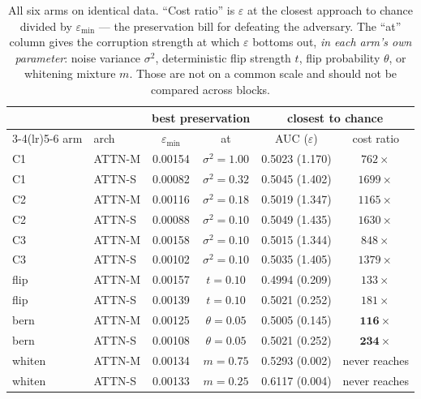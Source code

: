 \documentclass[11pt,a4paper]{article}
\newcommand{\vs}{\sigma^2}
\begin{document}
\begin{table}[h]\centering\small
\begin{tabular}{llcccc}
\toprule
& & \multicolumn{2}{c}{best preservation} & \multicolumn{2}{c}{closest to chance}\\
\cmidrule(lr){3-4}\cmidrule(lr){5-6}
arm & arch & $\varepsilon_{\min}$ & at & AUC ($\varepsilon$) & cost ratio\\
\midrule
C1     & ATTN-M & 0.00154 & $\vs\!=\!1.00$  & 0.5023 (1.170) & $762\times$\\
C1     & ATTN-S & 0.00082 & $\vs\!=\!0.32$  & 0.5045 (1.402) & $1699\times$\\
C2     & ATTN-M & 0.00116 & $\vs\!=\!0.18$  & 0.5019 (1.347) & $1165\times$\\
C2     & ATTN-S & 0.00088 & $\vs\!=\!0.10$  & 0.5049 (1.435) & $1630\times$\\
C3     & ATTN-M & 0.00158 & $\vs\!=\!0.10$  & 0.5015 (1.344) & $848\times$\\
C3     & ATTN-S & 0.00102 & $\vs\!=\!0.10$  & 0.5035 (1.405) & $1379\times$\\
\addlinespace
flip   & ATTN-M & 0.00157 & $t\!=\!0.10$    & 0.4994 (0.209) & $133\times$\\
flip   & ATTN-S & 0.00139 & $t\!=\!0.10$    & 0.5021 (0.252) & $181\times$\\
bern   & ATTN-M & 0.00125 & $\theta\!=\!0.05$ & 0.5005 (0.145) & $\mathbf{116\times}$\\
bern   & ATTN-S & 0.00108 & $\theta\!=\!0.05$ & 0.5021 (0.252) & $\mathbf{234\times}$\\
\addlinespace
whiten & ATTN-M & 0.00134 & $m\!=\!0.75$    & 0.5293 (0.002) & never reaches\\
whiten & ATTN-S & 0.00133 & $m\!=\!0.25$    & 0.6117 (0.004) & never reaches\\
\bottomrule
\end{tabular}
\caption{All six arms on identical data. ``Cost ratio'' is $\varepsilon$ at the
closest approach to chance divided by $\varepsilon_{\min}$ --- the preservation
bill for defeating the adversary. The ``at'' column gives the corruption
strength at which $\varepsilon$ bottoms out, \emph{in each arm's own
parameter}: noise variance $\vs$, deterministic flip strength $t$, flip
probability $\theta$, or whitening mixture $m$. Those are not on a common
scale and should not be compared across blocks.}
\label{tab:e1}
\end{table}
\end{document}

